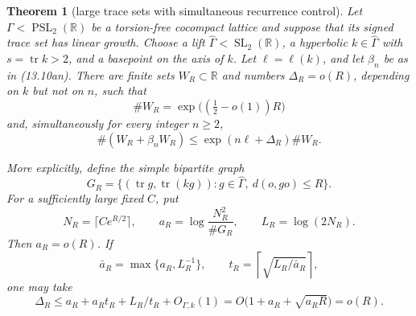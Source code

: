\documentclass[11pt,reqno]{amsart}
\newtheorem{theorem}{Theorem}[section]
\theoremstyle{definition}
\theoremstyle{remark}
\newcommand{\R}{\mathbb R}
\newcommand{\Tr}{\operatorname{tr}}
\newcommand{\SL}{\operatorname{SL}}
\newcommand{\PSL}{\operatorname{PSL}}
\begin{document}
\begin{theorem}[large trace sets with simultaneous recurrence control]
\label{thm:drc-trace-recurrence}
Let \(\Gamma<\PSL_2(\R)\) be a torsion-free cocompact lattice and suppose
that its signed trace set has linear growth.  Choose a lift
\(\widehat\Gamma<\SL_2(\R)\), a hyperbolic
\(k\in\widehat\Gamma\) with \(s=\Tr k>2\), and a basepoint on the axis of
\(k\).  Let \(\ell=\ell(k)\), and let \(\beta_n\) be as in
(13.10an).  There are finite sets \(W_R\subset\R\) and numbers
\(\Delta_R=o(R)\), depending on \(k\) but not on \(n\), such that
\[
 \#W_R=\exp\bigl((\tfrac12-o(1))R\bigr)
\tag{13.10bc}
\]
and, simultaneously for every integer \(n\ge2\),
\[
 \#(W_R+\beta_nW_R)
 \le \exp(n\ell+\Delta_R)\#W_R.
\tag{13.10bd}
\]

More explicitly, define the simple bipartite graph
\[
 G_R=\{(\Tr g,\Tr(kg)):
          g\in\widehat\Gamma,\ d(o,go)\le R\}.
\tag{13.10be}
\]
For a sufficiently large fixed \(C\), put
\[
 N_R=\lceil Ce^{R/2}\rceil,
 \qquad a_R=\log\frac{N_R^2}{\#G_R},
 \qquad L_R=\log(2N_R).
\]
Then \(a_R=o(R)\).  If
\[
 \bar a_R=\max\{a_R,L_R^{-1}\},
 \qquad
 t_R=\left\lceil\sqrt{L_R/\bar a_R}\right\rceil,
\tag{13.10bf}
\]
one may take
\[
 \Delta_R
 \le a_R+a_Rt_R+L_R/t_R+O_{\Gamma,k}(1)
 =O\bigl(1+a_R+\sqrt{a_RR}\bigr)=o(R).
\tag{13.10bg}
\]
\end{theorem}
\end{document}
